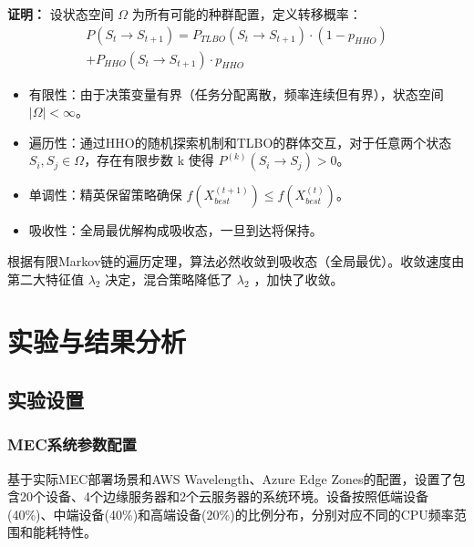 \documentclass[conference]{IEEEtran}
\begin{document}
\noindent\textbf{证明：}  
设状态空间 $\Omega$ 为所有可能的种群配置，定义转移概率：
\begin{equation}
\begin{split}
    P(S_t \rightarrow S_{t+1}) = P_{TLBO}(S_t \rightarrow S_{t+1}) \cdot (1-p_{HHO}) \\
    + P_{HHO}(S_t \rightarrow S_{t+1}) \cdot p_{HHO}
\end{split}
\end{equation}
\begin{itemize}
    \item 有限性：由于决策变量有界（任务分配离散，频率连续但有界），状态空间 $|\Omega| < \infty$。
    \item 遍历性：通过HHO的随机探索机制和TLBO的群体交互，对于任意两个状态 $S_i, S_j \in \Omega$，存在有限步数 k 使得 $P^{(k)}(S_i \rightarrow S_j) > 0$。
    \item 单调性：精英保留策略确保 $f(X_{best}^{(t+1)}) \leq f(X_{best}^{(t)})$。
    \item 吸收性：全局最优解构成吸收态，一旦到达将保持。
\end{itemize}
根据有限Markov链的遍历定理，算法必然收敛到吸收态（全局最优）。收敛速度由第二大特征值 $\lambda_2$ 决定，混合策略降低了 $\lambda_2$ ，加快了收敛。
\section{实验与结果分析}
\subsection{实验设置}
\subsubsection{MEC系统参数配置}
基于实际MEC部署场景和AWS Wavelength、Azure Edge Zones的配置，设置了包含20个设备、4个边缘服务器和2个云服务器的系统环境。设备按照低端设备(40\%)、中端设备(40\%)和高端设备(20\%)的比例分布，分别对应不同的CPU频率范围和能耗特性。
\end{document}

